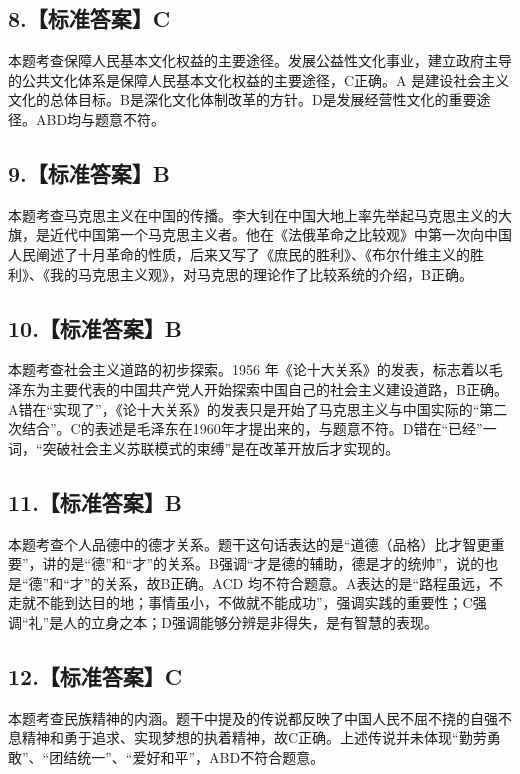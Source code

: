 \documentclass[UTF8,11pt]{ctexart}
\begin{document}
\subsection*{8.【标准答案】C}

本题考查保障人民基本文化权益的主要途径。发展公益性文化事业，建立政府主导的公共文化体系是保障人民基本文化权益的主要途径，C正确。A 是建设社会主义文化的总体目标。B是深化文化体制改革的方针。D是发展经营性文化的重要途径。ABD均与题意不符。


\subsection*{9.【标准答案】B}

本题考查马克思主义在中国的传播。李大钊在中国大地上率先举起马克思主义的大旗，是近代中国第一个马克思主义者。他在《法俄革命之比较观》中第一次向中国人民阐述了十月革命的性质，后来又写了《庶民的胜利》、《布尔什维主义的胜利》、《我的马克思主义观》，对马克思的理论作了比较系统的介绍，B正确。


\subsection*{10.【标准答案】B}

本题考查社会主义道路的初步探索。1956 年《论十大关系》的发表，标志着以毛泽东为主要代表的中国共产党人开始探索中国自己的社会主义建设道路，B正确。A错在“实现了”，《论十大关系》的发表只是开始了马克思主义与中国实际的“第二次结合”。C的表述是毛泽东在1960年才提出来的，与题意不符。D错在“已经”一词，“突破社会主义苏联模式的束缚”是在改革开放后才实现的。


\subsection*{11.【标准答案】B}

本题考查个人品德中的德才关系。题干这句话表达的是“道德（品格）比才智更重要”，讲的是“德”和“才”的关系。B强调“才是德的辅助，德是才的统帅”，说的也是“德”和“才”的关系，故B正确。ACD 均不符合题意。A表达的是“路程虽远，不走就不能到达目的地；事情虽小，不做就不能成功”，强调实践的重要性；C强调“礼”是人的立身之本；D强调能够分辨是非得失，是有智慧的表现。


\subsection*{12.【标准答案】C}

本题考查民族精神的内涵。题干中提及的传说都反映了中国人民不屈不挠的自强不息精神和勇于追求、实现梦想的执着精神，故C正确。上述传说并未体现“勤劳勇敢”、“团结统一”、“爱好和平”，ABD不符合题意。
\end{document}
